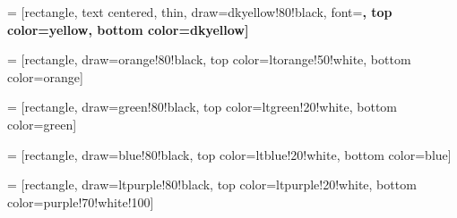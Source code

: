 

 = [rectangle, 
  text centered,
  thin,
  draw=dkyellow!80!black,
  font=\bfseries,
  top color=yellow,
  bottom color=dkyellow]

 = [rectangle, 
  draw=orange!80!black,
  top color=ltorange!50!white,
  bottom color=orange]

 = [rectangle, 
  draw=green!80!black,
  top color=ltgreen!20!white,
  bottom color=green]

 = [rectangle, 
  draw=blue!80!black,
  top color=ltblue!20!white,
  bottom color=blue]

 = [rectangle, 
  draw=ltpurple!80!black,
  top color=ltpurple!20!white,
  bottom color=purple!70!white!100]

